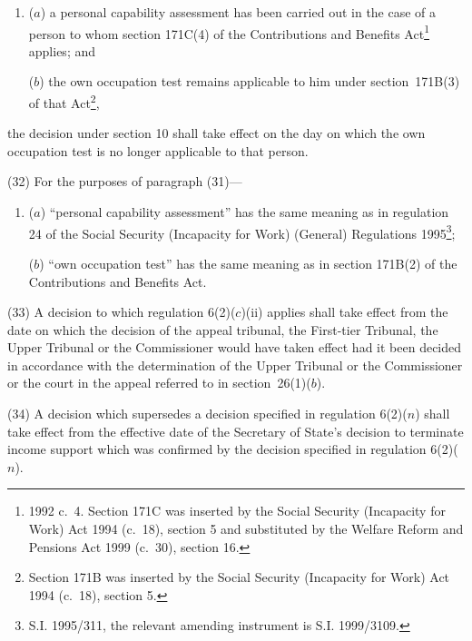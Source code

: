 \documentclass[12pt,a4paper]{article}
\begin{document}
\begin{enumerate}\item[]
($a$) a personal capability assessment has been carried out in the case of a person to whom section 171C(4) of the Contributions and Benefits Act\footnote{1992 c.\ 4. Section 171C was inserted by the Social Security (Incapacity for Work) Act 1994 (c.\ 18), section 5 and substituted by the Welfare Reform and Pensions Act 1999 (c.\ 30), section 16.} applies; and

($b$) the own occupation test remains applicable to him under section~171B(3) of that Act\footnote{Section 171B was inserted by the Social Security (Incapacity for Work) Act 1994 (c.\ 18), section 5.},
\end{enumerate}
the decision under section 10 shall take effect on the day 
on which the own occupation test is no longer applicable to that person.

(32) For the purposes of paragraph (31)—
\begin{enumerate}\item[]
($a$) “personal capability assessment” has the same meaning as in regulation 24 of the Social Security (Incapacity for Work) (General) Regulations 1995\footnote{S.I. 1995/311, the relevant amending instrument is S.I. 1999/3109.};

($b$) “own occupation test” has the same meaning as in section 171B(2) of the Contributions and Benefits Act.
\end{enumerate}

(33) A decision to which regulation 6(2)($c$)(ii)  applies shall take effect from the date on which 
the decision of the appeal tribunal, the First-tier Tribunal, the Upper Tribunal or the Commissioner  %
would have taken effect had it been decided in accordance with the determination of the 
Upper Tribunal  %
or the Commissioner  %
or the court in the appeal referred to in section~26(1)($b$).

(34) A decision which supersedes a decision specified in regulation 6(2)($n$)  shall take effect from the effective date of the Secretary of State’s decision to terminate income support which was confirmed by the decision specified in regulation 6(2)($n$).
\end{document}
